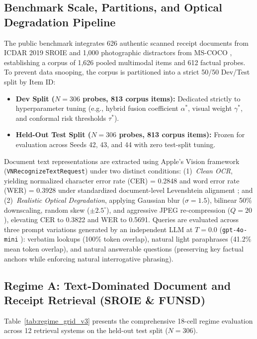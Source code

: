 \documentclass[conference]{IEEEtran}
\begin{document}
\subsection{Benchmark Scale, Partitions, and Optical Degradation Pipeline}
The public benchmark integrates 626 authentic scanned receipt documents from ICDAR 2019 SROIE \cite{huang2019sroie} and 1,000 photographic distractors from MS-COCO \cite{lin2014coco}, establishing a corpus of 1,626 pooled multimodal items and 612 factual probes. To prevent data snooping, the corpus is partitioned into a strict 50/50 Dev/Test split by Item ID:
\begin{itemize}
    \setlength{\itemsep}{0.2pt plus 0.1pt}
    \setlength{\parskip}{0pt}
    \item \textbf{Dev Split ($N=306$ probes, 813 corpus items):} Dedicated strictly to hyperparameter tuning (e.g., hybrid fusion coefficient $\alpha^*$, visual weight $\gamma^*$, and conformal risk thresholds $\tau^*$).
    \item \textbf{Held-Out Test Split ($N=306$ probes, 813 corpus items):} Frozen for evaluation across Seeds 42, 43, and 44 with zero test-split tuning.
\end{itemize}

Document text representations are extracted using Apple's Vision framework (\texttt{VNRecognizeTextRequest}) under two distinct conditions: (1)~\emph{Clean OCR}, yielding normalized character error rate (CER) = 0.2848 and word error rate (WER) = 0.3928 under standardized document-level Levenshtein alignment \cite{schneider2024jiwer}; and (2)~\emph{Realistic Optical Degradation}, applying Gaussian blur ($\sigma=1.5$), bilinear 50\% downscaling, random skew ($\pm 2.5^\circ$), and aggressive JPEG re-compression ($Q=20$), elevating CER to 0.3822 and WER to 0.5691. Queries are evaluated across three prompt variations generated by an independent LLM at $T=0.0$ (\texttt{gpt-4o-mini} \cite{openai2024gpt4o}): verbatim lookups (100\% token overlap), natural light paraphrases (41.2\% mean token overlap), and natural answerable questions (preserving key factual anchors while enforcing natural interrogative phrasing).

\subsection{Regime A: Text-Dominated Document and Receipt Retrieval (SROIE \& FUNSD)}
\label{sec:regime_a_text}

Table~\ref{tab:regime_grid_v3} presents the comprehensive 18-cell regime evaluation across 12 retrieval systems on the held-out test split ($N=306$). 
\end{document}
